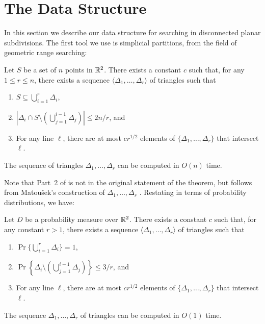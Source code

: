 \documentclass{patmorin}
\begin{document}
\section{The Data Structure}

In this section we describe our data structure for searching in disconnected
planar subdivisions.  The first tool we use is simplicial partitions,
from the field of geometric range searching:

\begin{thm}[Matou\v{s}ek 1991]
Let $S$ be a set of $n$ points in $\mathbb{R}^2$. There exists a constant
$c$ such that, for any $1\le r \le n$, there exists a sequence
$\langle \Delta_1,\ldots,\Delta_r\rangle$ of triangles such that
  \begin{enumerate}
    \item $S\subseteq \bigcup_{i=1}^r \Delta_i$,
  
    \item $\left|\Delta_i \cap S\setminus
    \left(\bigcup_{j=1}^{i-1}\Delta_j\right)\right| \le 2n/r$, and
  
    \item For any line $\ell$, there are at most $cr^{1/2}$ elements of
  $\{\Delta_1,\ldots,\Delta_r\}$ that intersect $\ell$.
  \end{enumerate}
  The sequence of triangles $\Delta_1,\ldots,\Delta_r$ can be computed
  in $O(n)$ time.
\end{thm}

Note that Part~2 of  is not in the original
statement of the theorem, but follows from Matou\v{s}ek's construction
of $\Delta_1,\ldots,\Delta_r$ \cite{m91}.
Restating  in terms of probability distributions,
we have:

\begin{thm}
Let $D$ be a probability measure over $\mathbb{R}^2$. There exists a constant
$c$ such that, for any constant $r>1$, there exists a sequence
$\langle \Delta_1,\ldots,\Delta_r\rangle$ of triangles such that
  \begin{enumerate}
    \item $\Pr\{\bigcup_{i=1}^r \Delta_i\} = 1$,
  
    \item $\Pr\left\{\Delta_i \setminus
    \left(\bigcup_{j=1}^{i-1}\Delta_j\right)\right\} \le 3/r$, and
  
    \item For any line $\ell$, there are at most $cr^{1/2}$ elements of
    $\{\Delta_1,\ldots,\Delta_r\}$ that intersect $\ell$.
  \end{enumerate}
  The sequence $\Delta_1,\ldots,\Delta_r$ of triangles can be computed
  in $O(1)$ time.
\end{thm}
\end{document}
